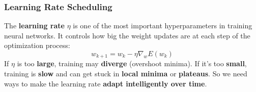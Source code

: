 \subsubsection{Learning Rate Scheduling}\label{sec:learning-rate-scheduling}

The \textbf{learning rate} $\eta$ is one of the most important hyperparameters in training neural networks. It controls how big the weight updates are at each step of the optimization process:
\begin{equation*}
    w_{k+1} = w_k - \eta \nabla_w E\left(w_k\right)
\end{equation*}
If $\eta$ is too \textbf{large}, training may \textbf{diverge} (overshoot minima). If it's too \textbf{small}, training is \textbf{slow} and can get stuck in \textbf{local minima} or \textbf{plateaus}. So we need ways to make the learning rate \textbf{adapt intelligently over time}.

